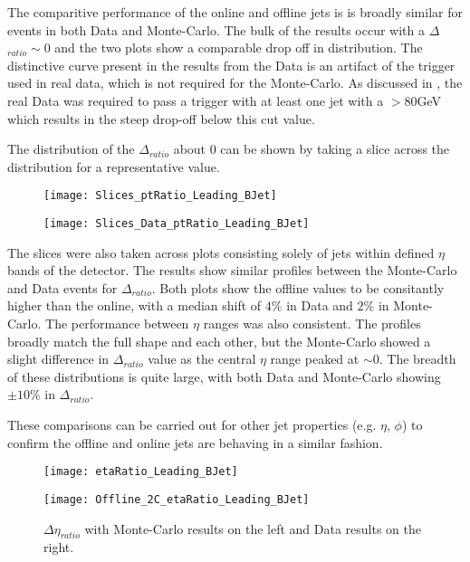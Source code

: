 		The comparitive performance of the online and offline jets is \pt is broadly similar for events in both Data and Monte-Carlo. The bulk of the results occur with a $\Delta$\pt$_{ratio}\sim0$ and the two plots show a comparable drop off in \pt distribution. The distinctive curve present in the results from the Data is an artifact of the trigger used in real data, which is not required for the Monte-Carlo. As discussed in , the real Data was required to pass a trigger with at least one jet with a \pt$>80$GeV which results in the steep drop-off below this cut value. 
		
		The distribution of the $\Delta$\pt$_{ratio}$ about 0 can be shown by taking a slice across the distribution for a representative \pt value. 
		
		\begin{figure}[h]
			\centering

			\begin{minipage}[h]{0.33\linewidth}
				\texttt{[image: Slices\_ptRatio\_Leading\_BJet]}
			\end{minipage}
			\quad
			\begin{minipage}[h]{0.33\linewidth}
				\texttt{[image: Slices\_Data\_ptRatio\_Leading\_BJet]}
			\end{minipage}
			\caption{ }
			\label{fig:O:leadingbptslice}
		\end{figure}
		
		The slices were also taken across plots consisting solely of jets within defined $\eta$ bands of the detector. The results show similar profiles between the Monte-Carlo and Data events for $\Delta$\pt$_{ratio}$. Both plots show the offline \pt values to be consitantly higher than the online, with a median shift of $4\%$ in Data and $2\%$ in Monte-Carlo. The performance between $\eta$ ranges was also consistent. The profiles broadly match the full shape and each other, but the Monte-Carlo showed a slight difference in  $\Delta$\pt$_{ratio}$ value as the central $\eta$ range peaked at $\sim0$. The breadth of these distributions is quite large, with both Data and Monte-Carlo showing $\pm10\%$ in $\Delta$\pt$_{ratio}$.
		
		These comparisons can be carried out for other jet properties (e.g. $\eta$, $\phi$) to confirm the offline and online jets are behaving in a similar fashion.
		
		\begin{figure}[h]
			\centering
			\begin{minipage}[h]{0.33\linewidth}
				\texttt{[image: etaRatio\_Leading\_BJet]}
				
			\end{minipage}
			\quad
			\begin{minipage}[h]{0.33\linewidth}
				\texttt{[image: Offline\_2C\_etaRatio\_Leading\_BJet]}
			\end{minipage}
			\caption{$\Delta \eta_{ratio}$ with Monte-Carlo results on the left and Data results on the right.}
			\label{fig:O:leadingbeta}
		\end{figure}
		
